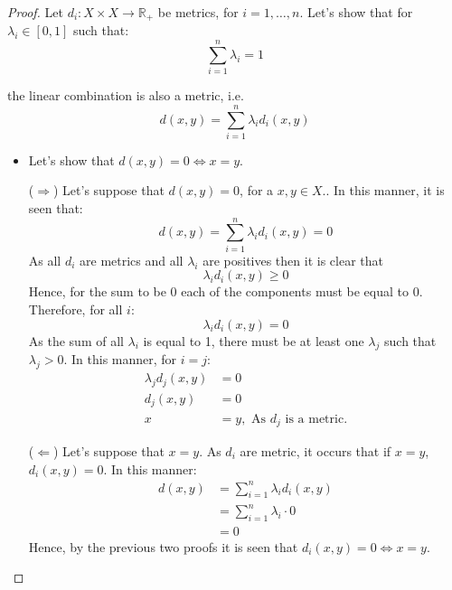 \documentclass[11pt]{article}
\theoremstyle{definition}
\theoremstyle{remark}
\theoremstyle{remark}
\theoremstyle{remark}
\newcommand{\R}{{\mathbb{R}}}
\begin{document}
\begin{proof}
  Let $d_{i}: X \times X \rightarrow \R_{+}$ be metrics, for $i = 1,\ldots,n$.
  Let's show that for $\lambda_{i} \in [0, 1]$ such that:
  \begin{equation*}
    \sum_{i=1}^{n}\lambda_{i} = 1
  \end{equation*}

  the linear combination is also a metric, i.e.
  \begin{equation*}
    d(x, y) = \sum_{i=1}^{n}\lambda_{i}d_{i}(x,y)
  \end{equation*}

  \begin{itemize}
    \item Let's show that $d(x,y) = 0 \iff x = y$.

      ($\Rightarrow$) Let's suppose that $d(x,y) = 0$, for a $x,y \in X$.. In
      this manner, it is seen that:
      \begin{equation*}
        d(x,y) = \sum_{i = 1}^{n} \lambda_{i}d_{i}(x,y) = 0
      \end{equation*}
      As all $d_{i}$ are metrics and all $\lambda_{i}$ are positives then it is
      clear that
      \begin{equation*}
        \lambda_{i}d_{i}(x,y) \ge 0
      \end{equation*}
      Hence, for the sum to be 0 each of the components must be equal to 0.
      Therefore, for all $i$:
      \begin{equation*}
        \lambda_{i}d_{i}(x, y) = 0
      \end{equation*}
      As the sum of all $\lambda_{i}$ is equal to 1, there must be at least one
      $\lambda_{j}$ such that $\lambda_{j} > 0$. In this manner, for $i = j$:
      \begin{align*}
        \lambda_{j}d_{j}(x, y) &= 0 \\
        d_{j}(x, y) &= 0 \\
        x &= y, \text{ As } d_{j} \text{ is a metric.}
      \end{align*}

      ($\Leftarrow$) Let's suppose that $x = y$. As $d_{i}$ are metric, it
      occurs that if $x = y$, $d_{i}(x, y) = 0$. In this manner:
      \begin{align*}
        d(x,y) &= \sum_{i = 1}^{n}\lambda_{i}d_{i}(x, y) \\
               &= \sum_{i=1}^{n} \lambda_{i} \cdot 0 \\
               &= 0
      \end{align*}
      Hence, by the previous two proofs it is seen that
      $d_{i}(x,y) = 0 \iff x = y$.


\end{itemize}
\end{proof}
\end{document}
